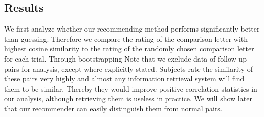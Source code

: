 


\subsection*{Results}
We first analyze whether our recommending method performs significantly better than guessing. Therefore we compare the rating of the comparison letter with highest cosine similarity to the rating of the randomly chosen comparison letter for each trial. Through bootstrapping Note that we exclude data of follow-up pairs for analysis, except where explicitly stated. Subjects rate the similarity of these pairs very highly and almost any information retrieval system will find them to be similar. Thereby they would improve positive correlation statistics in our analysis, although retrieving them is useless in practice. We will show later that our recommender can easily distinguish them from normal pairs.

